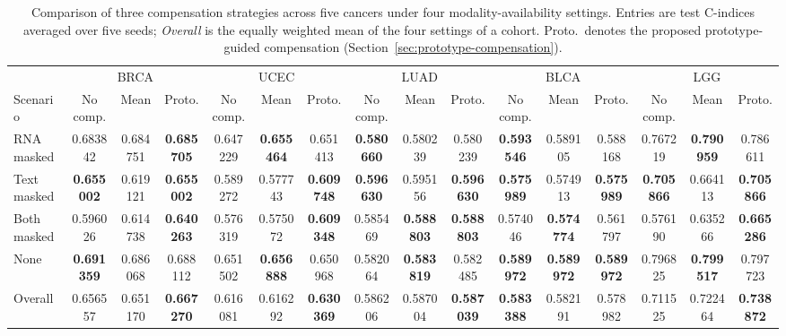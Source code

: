 \documentclass[pdflatex,sn-vancouver-num]{sn-jnl}
\begin{document}
\begin{table}
\centering
\caption{Comparison of three compensation strategies across five cancers
under four modality-availability settings. Entries are test C-indices
averaged over five seeds; \emph{Overall} is the equally weighted mean of the
four settings of a cohort. Proto.\ denotes the proposed prototype-guided
compensation (Section~\ref{sec:prototype-compensation}).}
\label{tab:prototype-compensation}
\scriptsize
\setlength{\tabcolsep}{2pt}
\renewcommand{\arraystretch}{1.35}
\begin{tabular*}{\linewidth}{@{\extracolsep{\fill}}l*{15}{c}@{}}
\toprule
 & \multicolumn{3}{c}{BRCA} & \multicolumn{3}{c}{UCEC}
 & \multicolumn{3}{c}{LUAD} & \multicolumn{3}{c}{BLCA}
 & \multicolumn{3}{c}{LGG} \\
\cmidrule(lr){2-4}\cmidrule(lr){5-7}\cmidrule(lr){8-10}
\cmidrule(lr){11-13}\cmidrule(lr){14-16}
Scenario
 & No comp. & Mean & Proto.
 & No comp. & Mean & Proto.
 & No comp. & Mean & Proto.
 & No comp. & Mean & Proto.
 & No comp. & Mean & Proto. \\
\midrule
RNA masked & 0.683842 & 0.684751 & \textbf{0.685705} & 0.647229 & \textbf{0.655464} & 0.651413 & \textbf{0.580660} & 0.580239 & 0.580239 & \textbf{0.593546} & 0.589105 & 0.588168 & 0.767219 & \textbf{0.790959} & 0.786611 \\
Text masked & \textbf{0.655002} & 0.619121 & \textbf{0.655002} & 0.589272 & 0.577743 & \textbf{0.609748} & \textbf{0.596630} & 0.595156 & \textbf{0.596630} & \textbf{0.575989} & 0.574913 & \textbf{0.575989} & \textbf{0.705866} & 0.664113 & \textbf{0.705866} \\
Both masked & 0.596026 & 0.614738 & \textbf{0.640263} & 0.576319 & 0.575072 & \textbf{0.609348} & 0.585469 & \textbf{0.588803} & \textbf{0.588803} & 0.574046 & \textbf{0.574774} & 0.561797 & 0.576190 & 0.635266 & \textbf{0.665286} \\
None & \textbf{0.691359} & 0.686068 & 0.688112 & 0.651502 & \textbf{0.656888} & 0.650968 & 0.582064 & \textbf{0.583819} & 0.582485 & \textbf{0.589972} & \textbf{0.589972} & \textbf{0.589972} & 0.796825 & \textbf{0.799517} & 0.797723 \\
\midrule
Overall & 0.656557 & 0.651170 & \textbf{0.667270} & 0.616081 & 0.616292 & \textbf{0.630369} & 0.586206 & 0.587004 & \textbf{0.587039} & \textbf{0.583388} & 0.582191 & 0.578982 & 0.711525 & 0.722464 & \textbf{0.738872} \\
\bottomrule
\end{tabular*}
\par\smallskip

\end{table}
\end{document}
